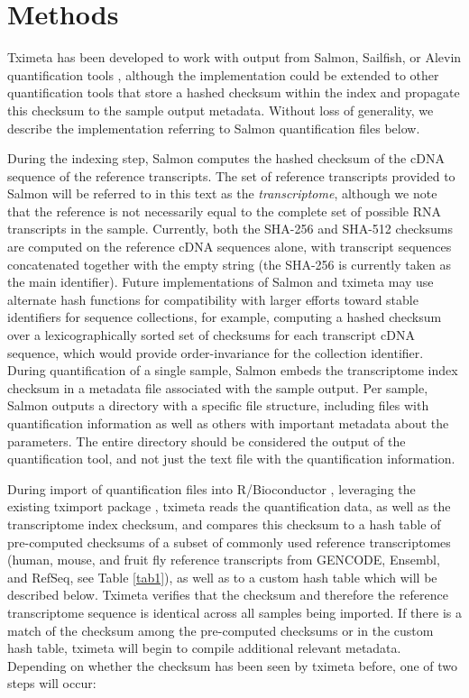 \documentclass[12pt]{article} \usepackage[utf8]{inputenc}
\begin{document}
\section*{Methods}

Tximeta has been developed to work with output from Salmon, Sailfish,
or Alevin quantification tools \citep{sailfish,salmon,alevin},
although the implementation could be extended to other quantification
tools that store a hashed checksum within the index and propagate this
checksum to the sample output metadata. Without loss of generality, we
describe the implementation referring to Salmon quantification files
below.

During the indexing step, Salmon computes the hashed checksum of the
cDNA sequence of the reference transcripts. The set of reference
transcripts provided to Salmon will be referred to in this text as the
\textit{transcriptome}, although we note that the reference is not
necessarily equal to the complete set of possible RNA transcripts in
the sample. Currently, both the SHA-256 and SHA-512 \citep{sha1}
checksums are computed on the reference cDNA sequences alone, with
transcript sequences concatenated together with the empty string (the
SHA-256 is currently taken as the main identifier). Future
implementations of Salmon and tximeta may use alternate hash functions
for compatibility with larger efforts toward stable identifiers for
sequence collections, for example, computing a hashed checksum over a
lexicographically sorted set of checksums for each transcript cDNA
sequence, which would provide order-invariance for the collection
identifier. During quantification of a single sample, Salmon embeds
the transcriptome index checksum in a metadata file associated with
the sample output. Per sample, Salmon outputs a directory with a
specific file structure, including files with quantification
information as well as others with important metadata about the
parameters. The entire directory should be considered the output of
the quantification tool, and not just the text file with the
quantification information.

During import of quantification files into R/Bioconductor
\citep{bioc}, leveraging the existing tximport package
\citep{tximport}, tximeta reads the quantification data, as well as
the transcriptome index checksum, and compares this checksum to a hash
table of pre-computed checksums of a subset of commonly used reference
transcriptomes (human, mouse, and fruit fly reference transcripts from
GENCODE, Ensembl, and RefSeq, see Table \ref{tab1}), as well as to a
custom hash table which will be described below. Tximeta verifies that
the checksum and therefore the reference transcriptome sequence is
identical across all samples being imported. If there is a match of
the checksum among the pre-computed checksums or in the custom hash table,
tximeta will begin to compile additional relevant
metadata. Depending on whether the checksum has been seen by tximeta
before, one of two steps will occur:
\end{document}
